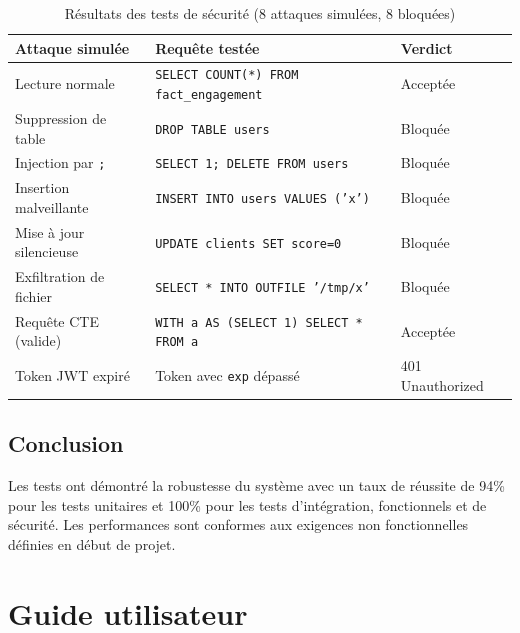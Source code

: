 \documentclass[a4paper,12pt]{report}
\begin{document}
\begin{doublespace}
\begin{table}[H]
\centering
\begin{tabular}{|p{5cm}|p{5cm}|p{3cm}|}
    \hline
    \textbf{Attaque simulée} & \textbf{Requête testée} & \textbf{Verdict} \\
    \hline
    Lecture normale & \texttt{SELECT COUNT(*) FROM fact\_engagement} & Acceptée \\
    \hline
    Suppression de table & \texttt{DROP TABLE users} & Bloquée \\
    \hline
    Injection par \texttt{;} & \texttt{SELECT 1; DELETE FROM users} & Bloquée \\
    \hline
    Insertion malveillante & \texttt{INSERT INTO users VALUES ('x')} & Bloquée \\
    \hline
    Mise à jour silencieuse & \texttt{UPDATE clients SET score=0} & Bloquée \\
    \hline
    Exfiltration de fichier & \texttt{SELECT * INTO OUTFILE '/tmp/x'} & Bloquée \\
    \hline
    Requête CTE (valide) & \texttt{WITH a AS (SELECT 1) SELECT * FROM a} & Acceptée \\
    \hline
    Token JWT expiré & Token avec \texttt{exp} dépassé & 401 Unauthorized \\
    \hline
\end{tabular}
\caption{Résultats des tests de sécurité (8 attaques simulées, 8 bloquées)}
\label{tab:security_tests}
\end{table}
\end{doublespace}

\section{Conclusion}
\begin{doublespace}
Les tests ont démontré la robustesse du système avec un taux de réussite de 94\% pour les tests unitaires et 100\% pour les tests d'intégration, fonctionnels et de sécurité. Les performances sont conformes aux exigences non fonctionnelles définies en début de projet.
\end{doublespace}

\newpage
\chapter{Guide utilisateur}
\end{document}
